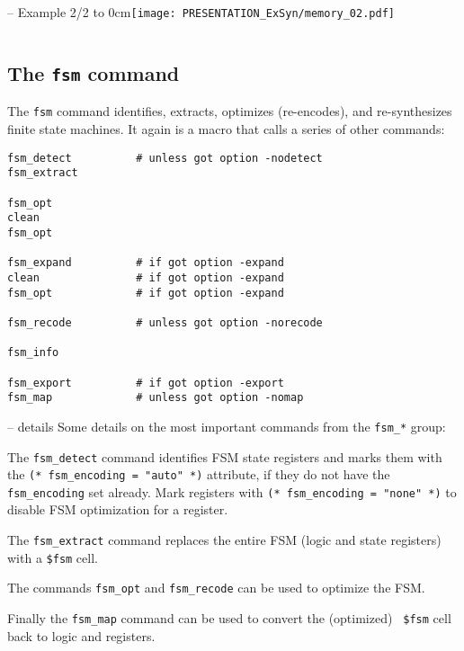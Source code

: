 \begin{frame}[t, fragile]{\subsecname{} -- Example 2/2}
\vbox to 0cm{\hfill\texttt{[image: PRESENTATION\_ExSyn/memory\_02.pdf]}\vss}
\vskip-1cm
\begin{columns}
\column[t]{5cm}

\column[t]{5cm}

\end{columns}
\end{frame}


\subsection{The {\tt fsm} command}

\begin{frame}[fragile]{\subsecname{}}
The {\tt fsm} command identifies, extracts, optimizes (re-encodes), and
re-synthesizes finite state machines. It again is a macro that calls
a series of other commands:

\begin{lstlisting}[xleftmargin=0.5cm, basicstyle=\ttfamily\fontsize{8pt}{10pt}\selectfont, language=ys]
fsm_detect          # unless got option -nodetect
fsm_extract

fsm_opt
clean
fsm_opt

fsm_expand          # if got option -expand
clean               # if got option -expand
fsm_opt             # if got option -expand

fsm_recode          # unless got option -norecode

fsm_info

fsm_export          # if got option -export
fsm_map             # unless got option -nomap
\end{lstlisting}
\end{frame}

\begin{frame}{\subsecname{} -- details}
Some details on the most important commands from the {\tt fsm\_*} group:

\bigskip
The {\tt fsm\_detect} command identifies FSM state registers and marks them
with the {\tt (* fsm\_encoding = "auto" *)} attribute, if they do not have the
{\tt fsm\_encoding} set already. Mark registers with {\tt (* fsm\_encoding =
"none" *)} to disable FSM optimization for a register.

\bigskip
The {\tt fsm\_extract} command replaces the entire FSM (logic and state
registers) with a {\tt \$fsm} cell.

\bigskip
The commands {\tt fsm\_opt} and {\tt fsm\_recode} can be used to optimize the
FSM.

\bigskip
Finally the {\tt fsm\_map} command can be used to convert the (optimized) {\tt
\$fsm} cell back to logic and registers.
\end{frame}

